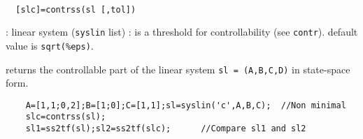 \begin{mandesc}
   \\ %
\end{mandesc}
\begin{calling_sequence}
\begin{verbatim}
  [slc]=contrss(sl [,tol])  
\end{verbatim}
\end{calling_sequence}
\begin{parameters}
  \begin{varlist}
    : linear system (\verb!syslin! list)
    : is a threshold for controllability (see \verb!contr!).  default value is \verb!sqrt(%eps)!.
  \end{varlist}
\end{parameters}
\begin{mandescription}
  returns the controllable part of the linear 
  system \verb!sl = (A,B,C,D)! in state-space form.
\end{mandescription}
\begin{examples}
  \begin{Verbatim}
    A=[1,1;0,2];B=[1;0];C=[1,1];sl=syslin('c',A,B,C);  //Non minimal
    slc=contrss(sl);
    sl1=ss2tf(sl);sl2=ss2tf(slc);      //Compare sl1 and sl2
  \end{Verbatim}
\end{examples}
\begin{manseealso}
       
\end{manseealso}
